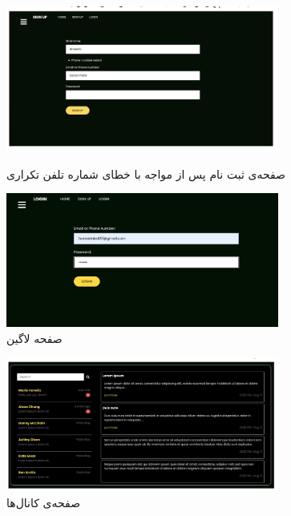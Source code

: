 \begin{figure}[H]
    \centering
        \includegraphics[width = 0.8\textwidth]{files/ui/samephonenumber.png}
        \caption{صفحه‌ی ثبت نام پس از مواجه با خطای شماره تلفن تکراری}
    \centering
        \includegraphics[width = 0.8\textwidth]{files/ui/login.png}
        \caption{صفحه لاگین}
\end{figure} 
\begin{figure}[H]
    \centering
        \includegraphics[width = 0.8\textwidth]{files/ui/channels.png}
        \caption{صفحه‌ی کانال‌ها}
\end{figure} 
